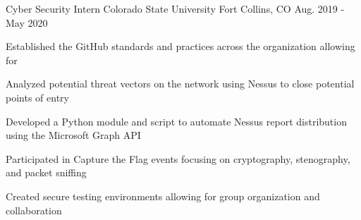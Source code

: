 \vspace{-5.0mm}


\begin{cventries}
  

  \cventry
    {Cyber Security Intern} %
    {Colorado State University} %
    {Fort Collins, CO} %
    {Aug. 2019 - May 2020} %
    {
      \begin{cvitems} %
        \item {Established the GitHub standards and practices across the organization allowing for }
        \item {Analyzed potential threat vectors on the network using Nessus to close potential points of entry}
        \item {Developed a Python module and script to automate Nessus report distribution using the Microsoft Graph API}
        \item {Participated in Capture the Flag events focusing on cryptography, stenography, and packet sniffing}
        \item {Created secure testing environments allowing for group organization and collaboration}
      \end{cvitems}
    }


\end{cventries}
